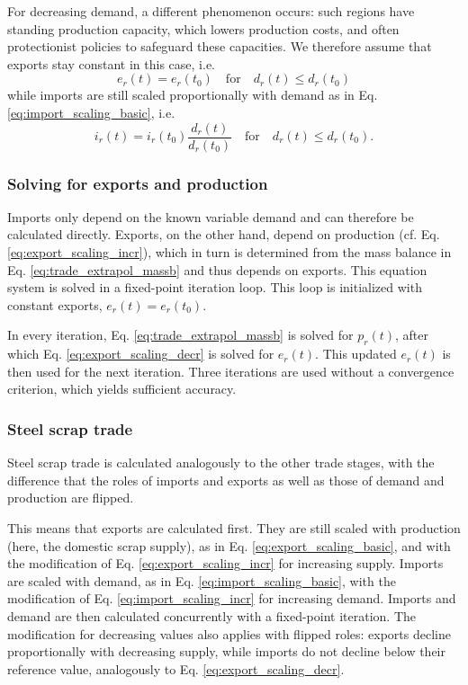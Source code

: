 For decreasing demand, a different phenomenon occurs: such regions have standing production capacity, which lowers production costs, and often protectionist policies to safeguard these capacities. We therefore assume that exports stay constant in this case, i.e.
\begin{equation} \label{eq:export_scaling_decr}
    e_r(t) = e_r(t_{0}) \quad\text{for}\quad d_r(t) \leq d_r(t_{0})
\end{equation}
while imports are still scaled proportionally with demand as in Eq. \eqref{eq:import_scaling_basic}, i.e.
\begin{equation} \label{eq:import_scaling_decr}
    i_r(t) = i_r(t_{0}) \frac{d_r(t)}{d_r(t_{0})}  \quad\text{for}\quad d_r(t) \leq d_r(t_{0}).
\end{equation}

\subsubsection{Solving for exports and production}

Imports only depend on the known variable demand and can therefore be calculated directly. Exports, on the other hand, depend on production (cf. Eq. \eqref{eq:export_scaling_incr}), which in turn is determined from the mass balance in Eq. \eqref{eq:trade_extrapol_massb} and thus depends on exports. This equation system is solved in a fixed-point iteration loop. This loop is initialized with constant exports, $e_r(t) = e_r(t_{0})$.

In every iteration, Eq. \eqref{eq:trade_extrapol_massb} is solved for $p_r(t)$, after which Eq. \eqref{eq:export_scaling_decr} is solved for $e_r(t)$. This updated $e_r(t)$ is then used for the next iteration. Three iterations are used without a convergence criterion, which yields sufficient accuracy.

\subsubsection{Steel scrap trade}

Steel scrap trade is calculated analogously to the other trade stages, with the difference that the roles of imports and exports as well as those of demand and production are flipped.

This means that exports are calculated first. They are still scaled with production (here, the domestic scrap supply), as in Eq. \eqref{eq:export_scaling_basic}, and with the modification of Eq. \eqref{eq:export_scaling_incr} for increasing supply. Imports are scaled with demand, as in Eq. \eqref{eq:import_scaling_basic}, with the modification of Eq. \eqref{eq:import_scaling_incr} for increasing demand. Imports and demand are then calculated concurrently with a fixed-point iteration.
The modification for decreasing values also applies with flipped roles: exports decline proportionally with decreasing supply, while imports do not decline below their reference value, analogously to Eq. \eqref{eq:export_scaling_decr}.

